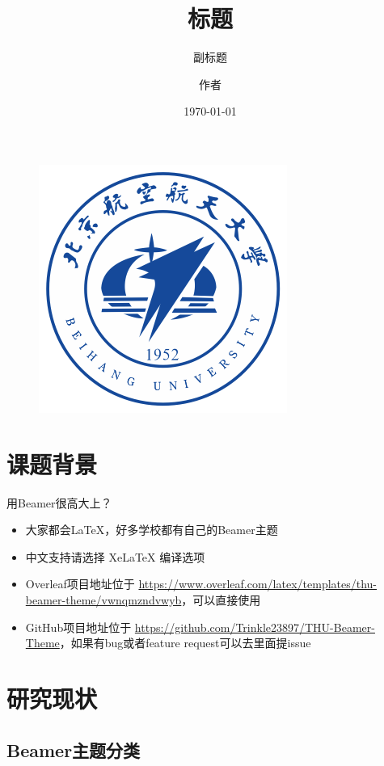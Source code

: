\documentclass[aspectratio=169]{beamer}
\author{作者}
\title{标题}
\subtitle{副标题}
\institute{北京航空航天大学}
\date{\today}
\begin{document}
\kaishu
\begin{frame}
    \titlepage
    \begin{figure}[htpb]
        \begin{center}
            \includegraphics[width=0.2\linewidth]{figure/buaa_logo.png}
        \end{center}
    \end{figure}
\end{frame}

\begin{frame}
    \tableofcontents[sectionstyle=show,subsectionstyle=show/shaded/hide,subsubsectionstyle=show/shaded/hide]
\end{frame}


\section{课题背景}

\begin{frame}{用Beamer很高大上？}
    \begin{itemize}[<+-| alert@+>] %
        \item 大家都会\LaTeX{}，好多学校都有自己的Beamer主题
        \item 中文支持请选择 Xe\LaTeX{} 编译选项
        \item Overleaf项目地址位于 \url{https://www.overleaf.com/latex/templates/thu-beamer-theme/vwnqmzndvwyb}，可以直接使用
        \item GitHub项目地址位于 \url{https://github.com/Trinkle23897/THU-Beamer-Theme}，如果有bug或者feature request可以去里面提issue
    \end{itemize}
\end{frame}


\section{研究现状}

\subsection{Beamer主题分类}
\end{document}
